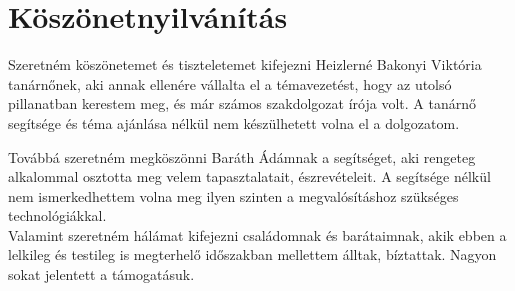 \documentclass[a4paper,12pt]{report}
\begin{document}
\section{Köszönetnyilvánítás}
    Szeretném köszönetemet és tiszteletemet kifejezni Heizlerné Bakonyi Viktória tanárnőnek, aki annak ellenére vállalta el
    a témavezetést, hogy az utolsó pillanatban kerestem meg, és már számos szakdolgozat írója volt. A tanárnő segítsége és
    téma ajánlása nélkül nem készülhetett volna el a dolgozatom.

    Továbbá szeretném megköszönni Baráth Ádámnak a segítséget, aki rengeteg alkalommal osztotta meg velem tapasztalatait, észrevételeit.
    A segítsége nélkül nem ismerkedhettem volna meg ilyen szinten a megvalósításhoz szükséges technológiákkal.\\

    Valamint szeretném hálámat kifejezni családomnak és barátaimnak, akik ebben a lelkileg és testileg is megterhelő időszakban
    mellettem álltak, bíztattak. Nagyon sokat jelentett a támogatásuk.\\
\end{document}
